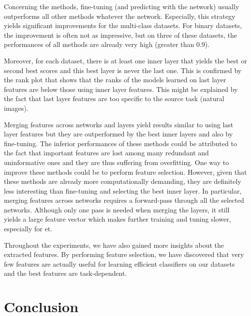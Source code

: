 Concerning the methods, fine-tuning (and predicting with the network) usually outperforms all other methods whatever the network. Especially, this strategy yields significant improvements for the multi-class datasets. For binary datasets, the improvement is often not as impressive, but on three of these datasets, the performances of all methods are already very high (greater than 0.9).

Moreover, for each dataset, there is at least one inner layer that yields the best or second best scores and this best layer is never the last one. This is confirmed by the rank plot that shows that the ranks of the models learned on last layer features are below those using inner layer features. This might be explained by the fact that last layer features are too specific to the source task (natural images).

Merging features across networks and layers yield results similar to using last layer features but they are outperformed by the best inner layers and also by fine-tuning. The inferior performances of these methods could be attributed to the fact that important features are lost among many redundant and uninformative ones and they are thus suffering from overfitting. One way to improve these methods could be to perform feature selection. However, given that these methods are already more computationally demanding, they are definitely less interesting than fine-tuning and selecting the best inner layer. In particular, merging features across networks requires a forward-pass through all the selected networks. Although only one pass is needed when merging the layers, it still yields a large feature vector which makes further training and tuning slower, especially for \acrshort{et}.

Throughout the experiments, we have also gained more insights about the extracted features. By performing feature selection, we have discovered that very few features are actually useful for learning efficient classifiers on our datasets and the best features are task-dependent.




\section{Conclusion}

